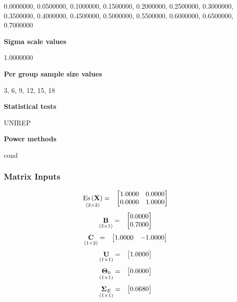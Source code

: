 \documentclass{glimmpse-report}
\begin{document}
0.0000000, 0.0500000, 0.1000000, 0.1500000, 0.2000000, 0.2500000, 0.3000000, 0.3500000, 0.4000000, 0.4500000, 0.5000000, 0.5500000, 0.6000000, 0.6500000, 0.7000000

{\bf Sigma scale values}

1.0000000

{\bf Per group sample size values}

3, 6, 9, 12, 15, 18

{\bf Statistical tests}

UNIREP

{\bf Power methods}

cond

\subsubsection{Matrix Inputs}

\begin{eqnarray*}
\underset{\left(2\times2\right)}{\text{Es}\left(\mathbf{X}\right)} & = & \begin{bmatrix}1.0000 & 0.0000\protect\\
0.0000 & 1.0000\protect\\
\end{bmatrix}
\end{eqnarray*}
\begin{eqnarray*}
\underset{\left(2\times1\right)}{\mathbf{B}} & = & \begin{bmatrix}0.0000\protect\\
0.7000\protect\\
\end{bmatrix}
\end{eqnarray*}
\begin{eqnarray*}
\underset{\left(1\times2\right)}{\mathbf{C}} & = & \begin{bmatrix}1.0000 & -1.0000\protect\\
\end{bmatrix}
\end{eqnarray*}
\begin{eqnarray*}
\underset{\left(1\times1\right)}{\mathbf{U}} & = & \begin{bmatrix}1.0000\protect\\
\end{bmatrix}
\end{eqnarray*}
\begin{eqnarray*}
\underset{\left(1\times1\right)}{\mathbf{\Theta}_0} & = & \begin{bmatrix}0.0000\protect\\
\end{bmatrix}
\end{eqnarray*}
\begin{eqnarray*}
\underset{\left(1\times1\right)}{\mathbf{\Sigma}_E} & = & \begin{bmatrix}0.0680\protect\\
\end{bmatrix}
\end{eqnarray*}
\end{document}
